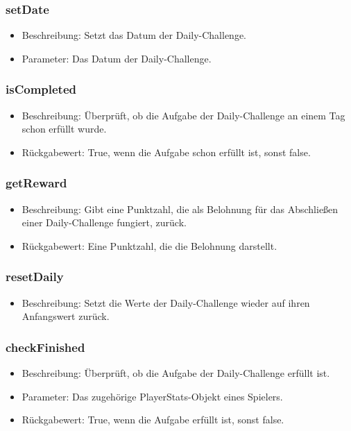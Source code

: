 \documentclass[a4paper]{scrreprt}
\begin{document}
    \subsubsection{setDate}
    \begin{itemize}
        \item Beschreibung: Setzt das Datum der Daily-Challenge.
        \item Parameter: Das Datum der Daily-Challenge.
    \end{itemize}
    \subsubsection{isCompleted}
    \begin{itemize}
        \item Beschreibung: Überprüft, ob die Aufgabe der Daily-Challenge an einem Tag schon erfüllt wurde.
        \item Rückgabewert: True, wenn die Aufgabe schon erfüllt ist, sonst false.
    \end{itemize}
    \subsubsection{getReward}
    \begin{itemize}
        \item Beschreibung: Gibt eine Punktzahl, die als Belohnung für das Abschließen einer Daily-Challenge fungiert, zurück.
        \item Rückgabewert: Eine Punktzahl, die die Belohnung darstellt.
    \end{itemize}
    \subsubsection{resetDaily}
    \begin{itemize}
        \item Beschreibung: Setzt die Werte der Daily-Challenge wieder auf ihren Anfangswert zurück.
    \end{itemize}
    \subsubsection{checkFinished}
    \begin{itemize}
        \item Beschreibung: Überprüft, ob die Aufgabe der Daily-Challenge erfüllt ist.
        \item Parameter: Das zugehörige PlayerStats-Objekt eines Spielers.
        \item Rückgabewert: True, wenn die Aufgabe erfüllt ist, sonst false.
    \end{itemize}
\end{document}
